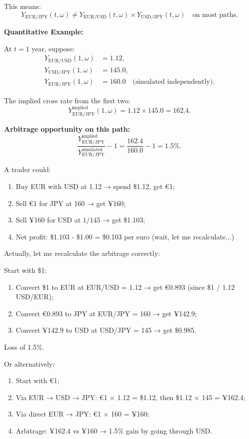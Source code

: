 This means:
\begin{equation}
	Y_{\text{EUR/JPY}}(t,\omega) \neq Y_{\text{EUR/USD}}(t,\omega) \times Y_{\text{USD/JPY}}(t,\omega) \quad \text{on most paths}.
\end{equation}

\textbf{Quantitative Example:}

At $t=1$ year, suppose:
\begin{align}
	Y_{\text{EUR/USD}}(1,\omega) &= 1.12, \\
	Y_{\text{USD/JPY}}(1,\omega) &= 145.0, \\
	Y_{\text{EUR/JPY}}(1,\omega) &= 160.0 \quad \text{(simulated independently)}.
\end{align}

The implied cross rate from the first two:
\begin{equation}
	Y_{\text{EUR/JPY}}^{\text{implied}}(1,\omega) = 1.12 \times 145.0 = 162.4.
\end{equation}

\textbf{Arbitrage opportunity on this path:}
\begin{equation}
	\frac{Y_{\text{EUR/JPY}}^{\text{implied}}}{Y_{\text{EUR/JPY}}^{\text{simulated}}} - 1 = \frac{162.4}{160.0} - 1 = 1.5\%.
\end{equation}

A trader could:
\begin{enumerate}
	\item Buy EUR with USD at 1.12 → spend \$1.12, get €1;
	\item Sell €1 for JPY at 160 → get ¥160;
	\item Sell ¥160 for USD at $1/145$ → get \$1.103;
	\item Net profit: \$1.103 - \$1.00 = \$0.103 per euro (wait, let me recalculate...)
\end{enumerate}

Actually, let me recalculate the arbitrage correctly:

Start with \$1:
\begin{enumerate}
	\item Convert \$1 to EUR at EUR/USD = 1.12 → get €0.893 (since \$1 / 1.12 USD/EUR);
	\item Convert €0.893 to JPY at EUR/JPY = 160 → get ¥142.9;
	\item Convert ¥142.9 to USD at USD/JPY = 145 → get \$0.985.
\end{enumerate}

Loss of 1.5\%. 

Or alternatively:
\begin{enumerate}
	\item Start with €1;
	\item Via EUR → USD → JPY: €1 × 1.12 = \$1.12, then \$1.12 × 145 = ¥162.4;
	\item Via direct EUR → JPY: €1 × 160 = ¥160;
	\item Arbitrage: ¥162.4 vs ¥160 → 1.5\% gain by going through USD.
\end{enumerate}

